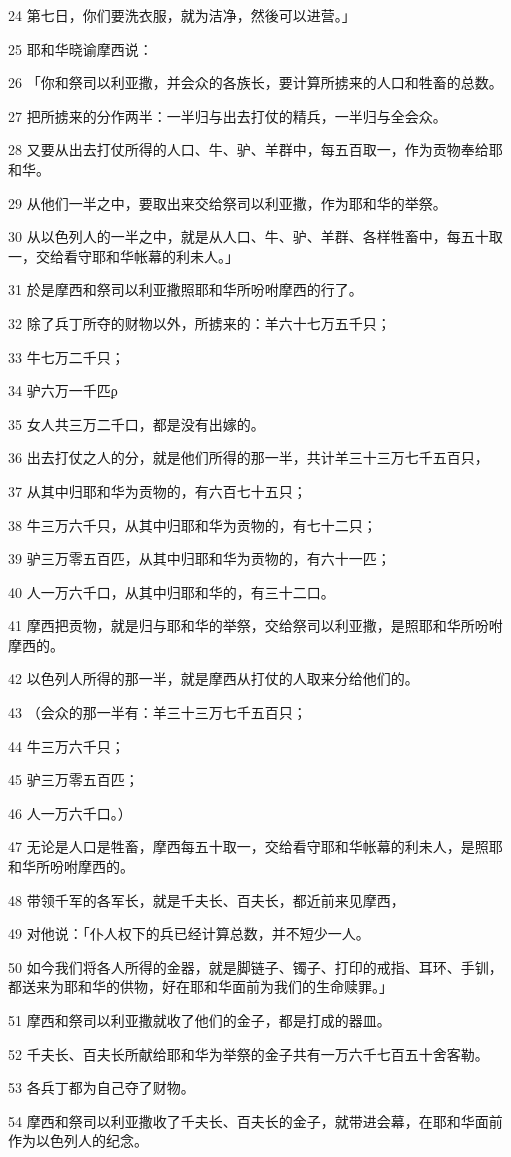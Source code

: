 \par 24 第七日，你们要洗衣服，就为洁净，然後可以进营。」
\par 25 耶和华晓谕摩西说：
\par 26 「你和祭司以利亚撒，并会众的各族长，要计算所掳来的人口和牲畜的总数。
\par 27 把所掳来的分作两半：一半归与出去打仗的精兵，一半归与全会众。
\par 28 又要从出去打仗所得的人口、牛、驴、羊群中，每五百取一，作为贡物奉给耶和华。
\par 29 从他们一半之中，要取出来交给祭司以利亚撒，作为耶和华的举祭。
\par 30 从以色列人的一半之中，就是从人口、牛、驴、羊群、各样牲畜中，每五十取一，交给看守耶和华帐幕的利未人。」
\par 31 於是摩西和祭司以利亚撒照耶和华所吩咐摩西的行了。
\par 32 除了兵丁所夺的财物以外，所掳来的：羊六十七万五千只；
\par 33 牛七万二千只；
\par 34 驴六万一千匹ϼ
\par 35 女人共三万二千口，都是没有出嫁的。
\par 36 出去打仗之人的分，就是他们所得的那一半，共计羊三十三万七千五百只，
\par 37 从其中归耶和华为贡物的，有六百七十五只；
\par 38 牛三万六千只，从其中归耶和华为贡物的，有七十二只；
\par 39 驴三万零五百匹，从其中归耶和华为贡物的，有六十一匹；
\par 40 人一万六千口，从其中归耶和华的，有三十二口。
\par 41 摩西把贡物，就是归与耶和华的举祭，交给祭司以利亚撒，是照耶和华所吩咐摩西的。
\par 42 以色列人所得的那一半，就是摩西从打仗的人取来分给他们的。
\par 43 （会众的那一半有：羊三十三万七千五百只；
\par 44 牛三万六千只；
\par 45 驴三万零五百匹；
\par 46 人一万六千口。）
\par 47 无论是人口是牲畜，摩西每五十取一，交给看守耶和华帐幕的利未人，是照耶和华所吩咐摩西的。
\par 48 带领千军的各军长，就是千夫长、百夫长，都近前来见摩西，
\par 49 对他说：「仆人权下的兵已经计算总数，并不短少一人。
\par 50 如今我们将各人所得的金器，就是脚链子、镯子、打印的戒指、耳环、手钏，都送来为耶和华的供物，好在耶和华面前为我们的生命赎罪。」
\par 51 摩西和祭司以利亚撒就收了他们的金子，都是打成的器皿。
\par 52 千夫长、百夫长所献给耶和华为举祭的金子共有一万六千七百五十舍客勒。
\par 53 各兵丁都为自己夺了财物。
\par 54 摩西和祭司以利亚撒收了千夫长、百夫长的金子，就带进会幕，在耶和华面前作为以色列人的纪念。

